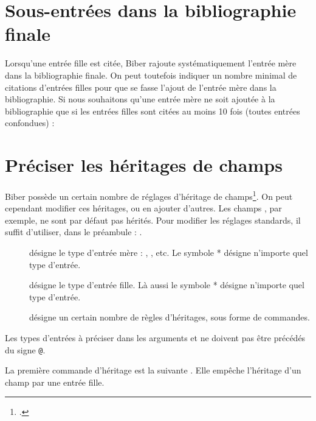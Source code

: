 \section{Sous-entrées dans la bibliographie finale}


Lorsqu'une entrée fille est citée, Biber rajoute systématiquement l'entrée mère dans la bibliographie finale. On peut toutefois indiquer un nombre minimal de citations d'entrées filles pour que se fasse l'ajout de l'entrée mère dans la bibliographie. Si nous souhaitons qu'une entrée mère ne soit ajoutée à la bibliographie que si les entrées filles sont citées au moins 10 fois (toutes entrées confondues) :


\begin{latexcode}
\usepackage[mincrossrefs=10,…]{biblatex}
\end{latexcode}





\section{Préciser les héritages de champs}

Biber possède un certain nombre de réglages d'héritage de champs\footcite{biblatex_crossrefsetup}. On peut cependant modifier ces héritages, ou en ajouter d'autres. Les champs , par exemple, ne sont par défaut pas hérités. 
Pour modifier les réglages standards, il suffit d'utiliser, dans le préambule  :
.

\begin{description}
\item[] désigne le type d'entrée mère : , , etc. Le symbole * désigne n'importe quel type d'entrée.
\item[] désigne le type d'entrée fille. Là aussi le symbole * désigne n'importe quel type d'entrée.
\item[] désigne un certain nombre de règles d'héritages, sous forme de commandes.
\end{description}

Les types d'entrées à préciser dans les arguments  et  ne doivent pas être précédés du signe \verb|@|.

La première commande d'héritage est la suivante .
Elle empêche l'héritage d'un champ par une entrée fille.

